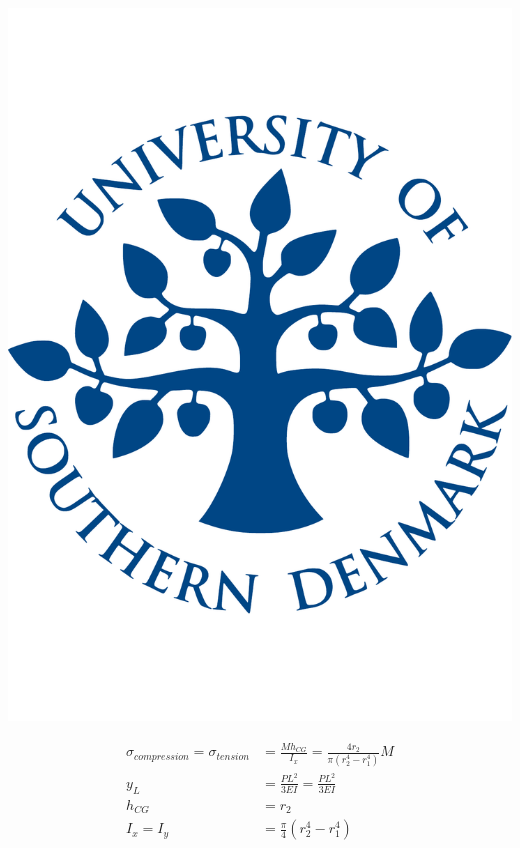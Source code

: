  \noindent\begin{minipage}{0.2\textwidth}%
      \includegraphics[width=\linewidth]{figures/sdu_logo.pdf}
  \end{minipage}%
  \hfill%
  \begin{minipage}{0.8\textwidth}
    \begin{equation}
      \begin{align*}
      \sigma _{compression} = \sigma _{tension} &= \frac{M h_{CG}}{I_x} = \frac{4 r_2}{\pi(r_2 ^4 - r_1 ^4)} M \\
      y_L &= \frac{P L^2}{3EI} = \frac{P L^2}{3EI} \\
      h_{CG} &= r_2 \\
      I_x = I_y &= \frac{\pi}{4} (r_2 ^4 - r_1 ^4)
      \end{align*}
    \end{equation}
  \end{minipage}

